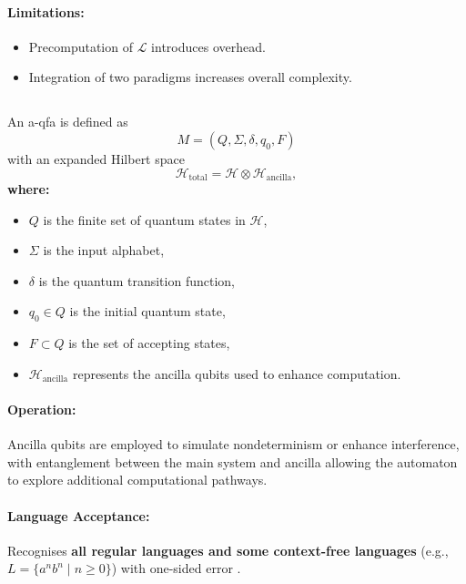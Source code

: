 \paragraph{Limitations:}
\begin{itemize}
    \item Precomputation of \( \mathcal{L} \) introduces overhead.
    \item Integration of two paradigms increases overall complexity.
\end{itemize}

\subsection{}
\label{subsec:a-qfa}
\begin{definition}
An \gls{a-qfa} is defined as 
\[
M = (Q, \Sigma, \delta, q_0, F)
\]
with an expanded Hilbert space 
\[
\mathcal{H}_{\text{total}} = \mathcal{H} \otimes \mathcal{H}_{\text{ancilla}},
\]
\textbf{where:}
\begin{itemize}
    \item \( Q \) is the finite set of quantum states in \( \mathcal{H} \),
    \item \( \Sigma \) is the input alphabet,
    \item \( \delta \) is the quantum transition function,
    \item \( q_0 \in Q \) is the initial quantum state,
    \item \( F \subset Q \) is the set of accepting states,
    \item \( \mathcal{H}_{\text{ancilla}} \) represents the ancilla qubits used to enhance computation.
\end{itemize}
\end{definition}

\paragraph{Operation:}  
Ancilla qubits are employed to simulate nondeterminism or enhance interference, with entanglement between the main system and ancilla allowing the automaton to explore additional computational pathways.

\paragraph{Language Acceptance:}  
Recognises \textbf{all regular languages and some context-free languages} (e.g., \( L = \{a^n b^n \mid n \geq 0\} \)) with one-sided error \cite{yakaryilmaz2011}.

